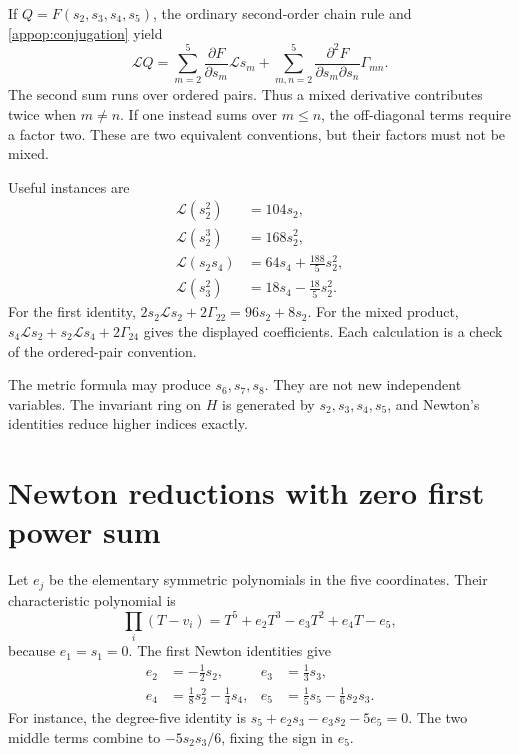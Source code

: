 If $Q=F(s_2,s_3,s_4,s_5)$, the ordinary second-order chain rule and \eqref{appop:conjugation} yield
\begin{equation}\label{appop:chainrule}
\mathcal LQ
=\sum_{m=2}^5\frac{\partial F}{\partial s_m}\mathcal Ls_m
+\sum_{m,n=2}^5
\frac{\partial^2F}{\partial s_m\partial s_n}\Gamma_{mn}.
\end{equation}
The second sum runs over ordered pairs. Thus a mixed derivative contributes twice when $m\ne n$. If one instead sums over $m\le n$, the off-diagonal terms require a factor two. These are two equivalent conventions, but their factors must not be mixed.

Useful instances are
\begin{align}
\mathcal L(s_2^2)&=104s_2,\label{appop:lradialtwo}\\
\mathcal L(s_2^3)&=168s_2^2,\label{appop:lradialthree}\\
\mathcal L(s_2s_4)&=64s_4+\frac{188}{5}s_2^2,\label{appop:ls2s4}\\
\mathcal L(s_3^2)&=18s_4-\frac{18}{5}s_2^2.\label{appop:ls3square}
\end{align}
For the first identity, $2s_2\mathcal Ls_2+2\Gamma_{22}=96s_2+8s_2$. For the mixed product, $s_4\mathcal Ls_2+s_2\mathcal Ls_4+2\Gamma_{24}$ gives the displayed coefficients. Each calculation is a check of the ordered-pair convention.

The metric formula may produce $s_6,s_7,s_8$. They are not new independent variables. The invariant ring on $H$ is generated by $s_2,s_3,s_4,s_5$, and Newton's identities reduce higher indices exactly.

\section{Newton reductions with zero first power sum}
Let $e_j$ be the elementary symmetric polynomials in the five coordinates. Their characteristic polynomial is
\[
\prod_i(T-v_i)=T^5+e_2T^3-e_3T^2+e_4T-e_5,
\]
because $e_1=s_1=0$. The first Newton identities give
\begin{align}
e_2&=-\frac12s_2,& e_3&=\frac13s_3,\label{appop:e23}\\
e_4&=\frac18s_2^2-\frac14s_4,&
e_5&=\frac15s_5-\frac16s_2s_3.\label{appop:e45}
\end{align}
For instance, the degree-five identity is $s_5+e_2s_3-e_3s_2-5e_5=0$. The two middle terms combine to $-5s_2s_3/6$, fixing the sign in $e_5$.

